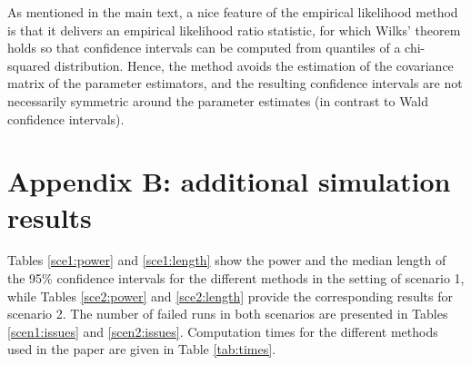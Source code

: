 \documentclass[num-refs]{wiley-article}
\begin{document}
As mentioned in the main text, a nice feature of the empirical likelihood method is that it delivers an empirical likelihood ratio statistic, for which Wilks’ theorem holds \cite{Zhao2015, Wang2015, Amorim2018} so that confidence intervals can be computed from quantiles of a chi-squared distribution. Hence, the method avoids the estimation of the covariance matrix of the parameter estimators, and the resulting confidence intervals are not necessarily symmetric around the parameter estimates (in contrast to Wald confidence intervals).

\newpage

\section*{Appendix B: additional simulation results}

Tables \ref{sce1:power} and \ref{sce1:length} show the power and the median length of the 95\% confidence intervals for the different methods in the setting of scenario 1, while Tables \ref{sce2:power} and \ref{sce2:length} provide the corresponding results for scenario 2. The number of failed runs in both scenarios are presented in Tables \ref{scen1:issues} and \ref{scen2:issues}. Computation times for the different methods used in the paper are given in Table \ref{tab:times}. 
\end{document}
